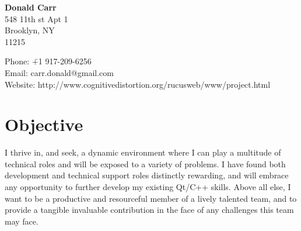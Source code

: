 \documentclass{article}
\begin{document}

\begin{center}
\textbf{Donald Carr}\\
548 11th st Apt 1 \\
Brooklyn, NY \\
11215 \\
\end{center}

\begin{tabbing}
\centering
Phone: \space \space \space \space \space \= +1 917-209-6256 \\
Email: \>carr.donald@gmail.com \\
Website: \>http://www.cognitivedistortion.org/rucusweb/www/project.html
\end{tabbing}

\section*{Objective}

I thrive in, and seek, a dynamic environment where I can play a multitude of technical roles and will be exposed to a variety of problems. I have found both development and technical support roles distinctly rewarding, and will embrace any opportunity to further develop my existing Qt/C++ skills. Above all else, I want to be a productive and resourceful member of a lively talented team, and to provide a tangible invaluable contribution in the face of any challenges this team may face. 
\end{document}
